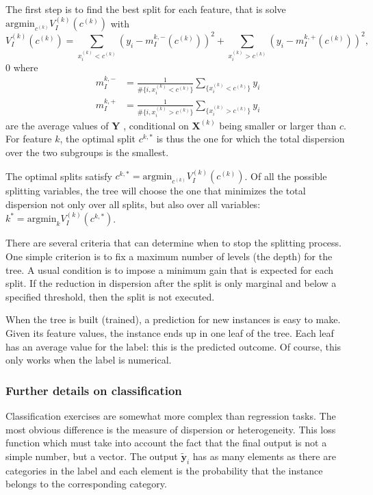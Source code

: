 The first step is to find the best split for each feature, that is solve $\mathrm{argmin}_{c^{(k)}} V^{(k)}_{I}(c^{(k)})$ with 
\begin{equation}
    V_{I}^{(k)} (c^{(k)}) = \sum_{x_{i}^{(k)} < c^{(k)}} (y_{i} - m_{I}^{k, -}(c^{(k)}))^{2} +  \sum_{x_{i}^{(k)} > c^{(k)}} (y_{i} - m_{I}^{k, +}(c^{(k)}))^{2}, 
\end{equation} 0 
where
\begin{align*}
    m_{I}^{k, -} &= \frac{1}{\# \{ i, x_{i}^{(k)} < c^{(k)} \} } \sum_{\{ x_{i}^{(k)} < c^{(k)} \} } y_{i} \\
    m_{I}^{k, +} &= \frac{1}{\# \{ i, x_{i}^{(k)} > c^{(k)} \} } \sum_{\{ x_{i}^{(k)} > c^{(k)} \} } y_{i}
\end{align*}
are the average values of $\boldsymbol{Y}$ , conditional on $\boldsymbol{X}^{(k)}$ being smaller or larger than $c$. For feature $k$, the optimal split $c^{k,\ast}$ is thus the one for which the total dispersion over the two subgroups is the smallest.

The optimal splits satisfy $c^{k, \ast} = \mathrm{argmin}_{c^{(k)}} V_{I}^{(k)} (c^{(k)})$. Of all the possible splitting variables, the tree will choose the one that minimizes the total dispersion not only over all splits, but also over all variables: $k^{\ast} = \mathrm{argmin}_{k} V_{I}^{(k)} (c^{k, \ast})$.

There are several criteria that can determine when to stop the splitting process. One simple criterion is to fix a maximum number of levels (the depth) for the tree. A usual condition is to impose a minimum gain that is expected for each split. If the reduction in dispersion after the split is only marginal and below a specified threshold, then the split is not executed.

When the tree is built (trained), a prediction for new instances is easy to make. Given its feature values, the instance ends up in one leaf of the tree. Each leaf has an average value for the label: this is the predicted outcome. Of course, this only works when the label is numerical. 

\subsubsection{Further details on classification}
Classification exercises are somewhat more complex than regression tasks. The most obvious difference is the measure of dispersion or heterogeneity. This loss function which must take into account the fact that the final output is not a simple number, but a vector. The output $\tilde{\mathbf{y}}_i$ has as many elements as there are categories in the label and each element is the probability that the instance belongs to the corresponding category.

